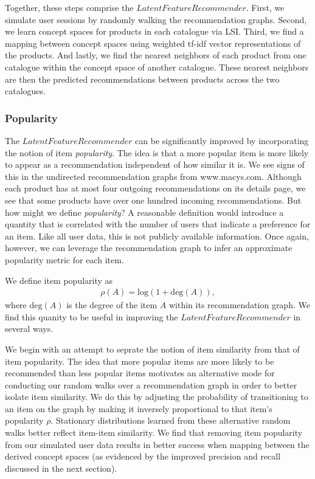 \documentclass[11pt]{article}
\begin{document}
Together, these steps comprise the $LatentFeatureRecommender$. First, we
simulate user sessions by randomly walking the recommendation graphs. Second, we
learn concept spaces for products in each catalogue via LSI. Third, we find a
mapping between concept spaces using weighted tf-idf vector representations of
the products. And lastly, we find the nearest neighbors of each product from one
catalogue within the concept space of another catalogue. These nearest neighbors
are then the predicted recommendations between products across the two
catalogues.

\subsubsection*{Popularity}
The $LatentFeatureRecommender$ can be significantly improved by incorporating
the notion of item {\em popularity}. The idea is that a more popular item is
more likely to appear as a recommendation independent of how similar it is.  We
see signs of this in the undirected recommendation graphs from www.macys.com.
Although each product has at most four outgoing recommendations on its details
page, we see that some products have over one hundred incoming recommendations.
But how might we define {\em popularity}? A reasonable definition would
introduce a quantity that is correlated with the number of users that indicate a
preference for an item. Like all user data, this is not publicly available
information.  Once again, however, we can leverage the recommendation graph to
infer an approximate popularity metric for each item.

We define item popularity as
\begin{align}
\rho(A) = \mathrm{log}(1 + \mathrm{deg}(A)),
\end{align}
where $\mathrm{deg}(A)$ is the degree of the item $A$ within its recommendation
graph.  We find this quanity to be useful in improving the
$LatentFeatureRecommender$ in several ways.

We begin with an attempt to seprate the notion of item similarity from that of
item popularity. The idea that more popular items are more likely to be
recommended than less popular items motivates an alternative mode for conducting
our random walks over a recommendation graph in order to better isolate item
similarity. We do this by adjusting the probability of transitioning to an item
on the graph by making it inversely proportional to that item's popularity
$\rho$. Stationary distributions learned from these alternative random walks
better reflect item-item similarity. We find that removing item popularity from
our simulated user data results in better success when mapping between the
derived concept spaces (as evidenced by the improved precision and recall
discussed in the next section).
\end{document}
